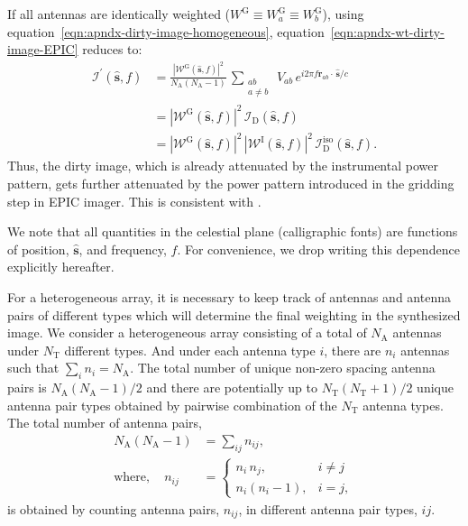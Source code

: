 \documentclass[a4paper,fleqn,usenatbib]{mnras}
\newcommand{\Nant}{N_\textrm{A}}
\begin{document}
If all antennas are identically weighted ($W^\textrm{G} \equiv W^\textrm{G}_a \equiv W^\textrm{G}_b$), using equation~\ref{eqn:apndx-dirty-image-homogeneous}, equation~\ref{eqn:apndx-wt-dirty-image-EPIC} reduces to: 
\begin{align}\label{eqn:apndx-wt-dirty-image-homogeneous}
  \mathcal{I}^\prime(\hat{\mathbf{s}},f) &= \frac{\left|\mathcal{W}^\textrm{G}(\hat{\mathbf{s}},f)\right|^2}{\Nant(\Nant-1)}\,\sum_{\substack{ab\\a\ne b}}\,V_{ab}\,e^{i 2\pi f\mathbf{r}_{ab}\!\cdot\,\hat{\mathbf{s}}/c} \nonumber\\
  &= \left|\mathcal{W}^\textrm{G}(\hat{\mathbf{s}},f)\right|^2\,\mathcal{I}_\textrm{D}(\hat{\mathbf{s}},f) \nonumber\\
  &= \left|\mathcal{W}^\textrm{G}(\hat{\mathbf{s}},f)\right|^2\,\left|\mathcal{W}^\textrm{I}(\hat{\mathbf{s}},f)\right|^2\,\mathcal{I}_\textrm{D}^\textrm{iso}(\hat{\mathbf{s}},f).
\end{align}
Thus, the dirty image, which is already attenuated by the instrumental power pattern, gets further attenuated by the power pattern introduced in the gridding step in EPIC imager. This is consistent with \citet{mor09}. 

We note that all quantities in the celestial plane (calligraphic fonts) are functions of position, $\hat{\mathbf{s}}$, and frequency, $f$. For convenience, we drop writing this dependence explicitly hereafter.

For a heterogeneous array, it is necessary to keep track of antennas and antenna pairs of different types which will determine the final weighting in the synthesized image. We consider a heterogeneous array consisting of a total of $\Nant$ antennas under $N_\textrm{T}$ different types. And under each antenna type $i$, there are $n_i$ antennas such that $\sum_i n_i = \Nant$. The total number of unique non-zero spacing antenna pairs is $\Nant(\Nant-1)/2$ and there are potentially up to $N_\textrm{T}(N_\textrm{T}+1)/2$ unique antenna pair types obtained by pairwise combination of the $N_\textrm{T}$ antenna types. The total number of antenna pairs, 
\begin{align}\label{eqn:apndx-total-baselines}
  \Nant(\Nant-1) &= \sum_{ij} n_{ij}, \\
  \textrm{where}, \quad   n_{ij} &= \begin{cases}
    n_i\,n_j, & i\ne j \\
    n_i(n_i-1), & i=j, 
  \end{cases}
\end{align}
is obtained by counting antenna pairs, $n_{ij}$, in different antenna pair types, $ij$.
\end{document}
